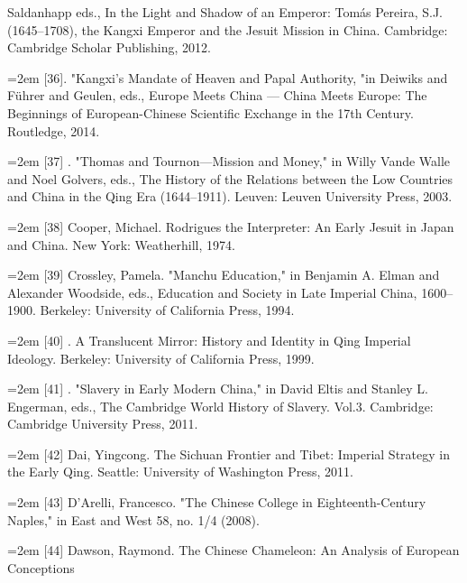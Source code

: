 \space%
Saldanhapp eds., In the Light and Shadow of an Emperor: Tomás Pereira, S.J.%
(1645–1708), the Kangxi Emperor and the Jesuit Mission in China. Cambridge:%
\space%
Cambridge Scholar Publishing, 2012.%
\par
\noindent\hangindent=2em
[36]. "Kangxi's Mandate of Heaven and Papal Authority, "in Deiwiks and Führer%
\space%
and Geulen, eds., Europe Meets China — China Meets Europe: The Beginnings of%
\space%
European-Chinese Scientific Exchange in the 17th Century. Routledge, 2014.%
\par
\noindent\hangindent=2em
[37] . "Thomas and Tournon—Mission and Money," in Willy Vande Walle and%
\space%
Noel Golvers, eds., The History of the Relations between the Low Countries and%
\space%
China in the Qing Era (1644–1911). Leuven: Leuven University Press, 2003.%
\par
\noindent\hangindent=2em
[38] Cooper, Michael. Rodrigues the Interpreter: An Early Jesuit in Japan and China.%
\space%
New York: Weatherhill, 1974.%
\par
\noindent\hangindent=2em
[39] Crossley, Pamela. "Manchu Education," in Benjamin A. Elman and Alexander%
\space%
Woodside, eds., Education and Society in Late Imperial China, 1600–1900.%
\space%
Berkeley: University of California Press, 1994.%
\par
\noindent\hangindent=2em
[40] . A Translucent Mirror: History and Identity in Qing Imperial Ideology.%
\space%
Berkeley: University of California Press, 1999.%
\par
\noindent\hangindent=2em
[41] . "Slavery in Early Modern China," in David Eltis and Stanley L. Engerman,%
\space%
eds., The Cambridge World History of Slavery. Vol.3. Cambridge: Cambridge%
\space%
University Press, 2011.%
\par
\noindent\hangindent=2em
[42] Dai, Yingcong. The Sichuan Frontier and Tibet: Imperial Strategy in the Early%
\space%
Qing. Seattle: University of Washington Press, 2011.%
\par
\noindent\hangindent=2em
[43] D'Arelli, Francesco. "The Chinese College in Eighteenth-Century Naples," in%
\space%
East and West 58, no. 1/4 (2008).%
\par
\noindent\hangindent=2em
[44] Dawson, Raymond. The Chinese Chameleon: An Analysis of European Conceptions%
